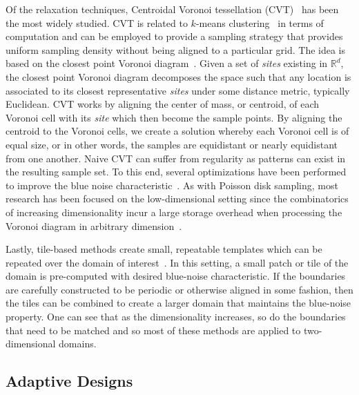 Of the relaxation techniques, Centroidal Voronoi tessellation (CVT)~\cite{DuFaberGunzburger1999} has been the most widely studied.
%
CVT is related to $k$-means clustering~\cite{HastieTibshiraniFriedman2008} in terms of computation and can be employed to provide a sampling strategy that provides uniform sampling density without being aligned to a particular grid.
%
The idea is based on the closest point Voronoi diagram~\cite{deBergCheongKreveld2008}.
%
Given a set of \emph{sites} existing in $\mathbb{R}^d$, the closest point Voronoi diagram decomposes the space such that any location is associated to its closest representative \emph{sites} under some distance metric, typically Euclidean.
%
CVT works by aligning the center of mass, or centroid, of each Voronoi cell with its \emph{site} which then become the sample points.
%
By aligning the centroid to the Voronoi cells, we create a solution whereby each Voronoi cell is of equal size, or in other words, the samples are equidistant or nearly equidistant from one another.
%
Naive CVT can suffer from regularity as patterns can exist in the resulting sample set.
%
To this end, several optimizations have been performed to improve the blue noise characteristic~\cite{BalzerSchlomerDeussen2009,ChenYuanChoi2012,deGoesBreedenOstromoukhov2012,XuLiuGotsman2011}.
%
As with Poisson disk sampling, most research has been focused on the low-dimensional setting since the combinatorics of increasing dimensionality incur a large storage overhead when processing the Voronoi diagram in arbitrary dimension~\cite{BoissonnatChazalYvinec2017}.

Lastly, tile-based methods create small, repeatable templates which can be repeated over the domain of interest~\cite{HillerDeussenKeller2001,KopfCohenOrDeussen2006,LagaeDutre2005,Ostromoukhov2007,OstromoukhovDonohueJodoin2004,WachtelPilleboueCoeurjolly2014}.
%
In this setting, a small patch or tile of the domain is pre-computed with desired blue-noise characteristic.
%
If the boundaries are carefully constructed to be periodic or otherwise aligned in some fashion, then the tiles can be combined to create a larger domain that maintains the blue-noise property.
%
One can see that as the dimensionality increases, so do the boundaries that need to be matched and so most of these methods are applied to two-dimensional domains.

\subsection{Adaptive Designs}
\label{sec:adaptiveSampling}

